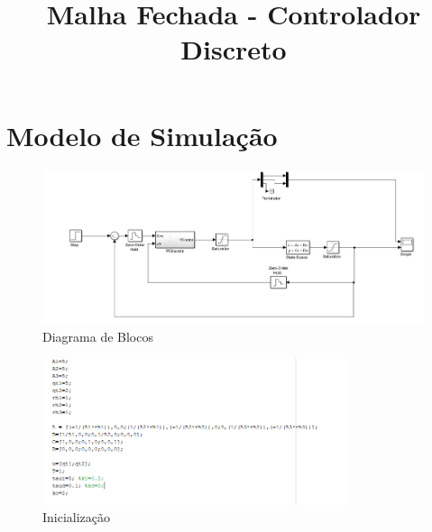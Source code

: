 \documentclass[11pt]{article}
\begin{document}
\title{\huge{Malha Fechada - Controlador Discreto}}
\maketitle

\section{Modelo de Simulação}
\begin{figure}[!htbp]
	\centering
      		 \includegraphics[page=1,width=1\textwidth]{img/diagrama.png} 
		\caption{Diagrama de Blocos}
\end{figure}
\begin{figure}[!htbp]
	\centering
      		 \includegraphics[page=1,width=0.8\textwidth]{img/parametros.png} 
		\caption{Inicialização}
\end{figure}
\end{document}
